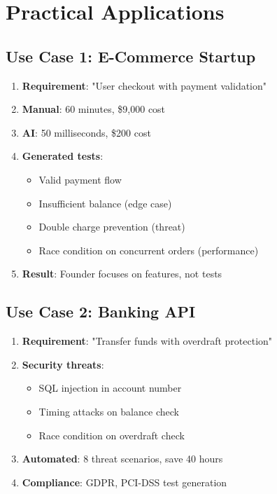 \documentclass[12pt,a4paper]{report}
\begin{document}
\chapter{Practical Applications}

\section{Use Case 1: E-Commerce Startup}

\begin{enumerate}
    \item \textbf{Requirement}: "User checkout with payment validation"
    \item \textbf{Manual}: 60 minutes, \$9,000 cost
    \item \textbf{AI}: 50 milliseconds, \$200 cost
    \item \textbf{Generated tests}:
    \begin{itemize}
        \item Valid payment flow
        \item Insufficient balance (edge case)
        \item Double charge prevention (threat)
        \item Race condition on concurrent orders (performance)
    \end{itemize}
    \item \textbf{Result}: Founder focuses on features, not tests
\end{enumerate}

\section{Use Case 2: Banking API}

\begin{enumerate}
    \item \textbf{Requirement}: "Transfer funds with overdraft protection"
    \item \textbf{Security threats}:
    \begin{itemize}
        \item SQL injection in account number
        \item Timing attacks on balance check
        \item Race condition on overdraft check
    \end{itemize}
    \item \textbf{Automated}: 8 threat scenarios, save 40 hours
    \item \textbf{Compliance}: GDPR, PCI-DSS test generation
\end{enumerate}
\end{document}
